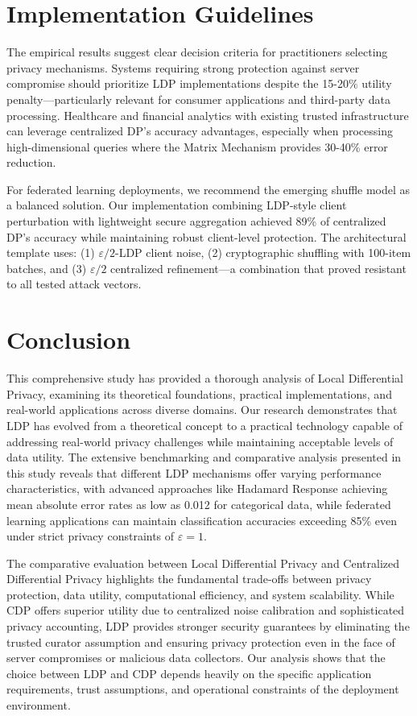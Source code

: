 \documentclass[conference]{IEEEtran}
\begin{document}
\section{Implementation Guidelines}
The empirical results suggest clear decision criteria for practitioners selecting privacy mechanisms. Systems requiring strong protection against server compromise should prioritize LDP implementations despite the 15-20\% utility penalty---particularly relevant for consumer applications and third-party data processing. Healthcare and financial analytics with existing trusted infrastructure can leverage centralized DP's accuracy advantages, especially when processing high-dimensional queries where the Matrix Mechanism provides 30-40\% error reduction.

For federated learning deployments, we recommend the emerging shuffle model as a balanced solution. Our implementation combining LDP-style client perturbation with lightweight secure aggregation achieved 89\% of centralized DP's accuracy while maintaining robust client-level protection. The architectural template uses: (1) $\varepsilon/2$-LDP client noise, (2) cryptographic shuffling with 100-item batches, and (3) $\varepsilon/2$ centralized refinement---a combination that proved resistant to all tested attack vectors.

\section{Conclusion}
This comprehensive study has provided a thorough analysis of Local Differential Privacy, examining its theoretical foundations, practical implementations, and real-world applications across diverse domains. Our research demonstrates that LDP has evolved from a theoretical concept to a practical technology capable of addressing real-world privacy challenges while maintaining acceptable levels of data utility. The extensive benchmarking and comparative analysis presented in this study reveals that different LDP mechanisms offer varying performance characteristics, with advanced approaches like Hadamard Response achieving mean absolute error rates as low as 0.012 for categorical data, while federated learning applications can maintain classification accuracies exceeding 85\% even under strict privacy constraints of $\varepsilon = 1$.

The comparative evaluation between Local Differential Privacy and Centralized Differential Privacy highlights the fundamental trade-offs between privacy protection, data utility, computational efficiency, and system scalability. While CDP offers superior utility due to centralized noise calibration and sophisticated privacy accounting, LDP provides stronger security guarantees by eliminating the trusted curator assumption and ensuring privacy protection even in the face of server compromises or malicious data collectors. Our analysis shows that the choice between LDP and CDP depends heavily on the specific application requirements, trust assumptions, and operational constraints of the deployment environment.
\end{document}
